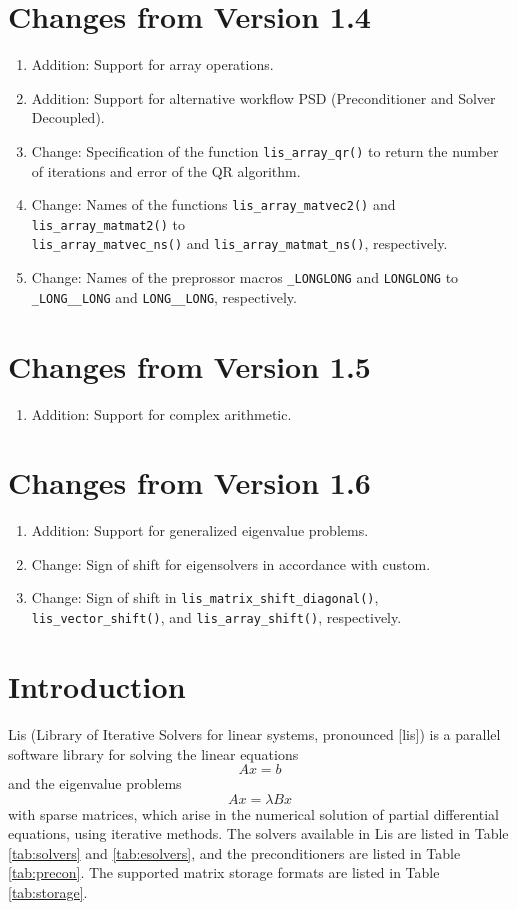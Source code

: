 \documentclass[a4paper]{article}
\begin{document}
\section*{Changes from Version 1.4}
\begin{enumerate}
\item Addition: Support for array operations.
\item Addition: Support for alternative workflow PSD (Preconditioner and Solver
      Decoupled). 
\item Change: Specification of the function 
      {\tt lis\_array\_qr()} to return 
      the number of iterations and error of the QR algorithm. 
\item Change: Names of the functions
      {\tt lis\_array\_matvec2()} and {\tt lis\_array\_matmat2()} to \\
      {\tt lis\_array\_matvec\_ns()} and {\tt lis\_array\_matmat\_ns()}, respectively.
\item Change: Names of the preprossor macros {\tt \_LONGLONG} and 
      {\tt LONGLONG} to {\tt \_LONG\_\_LONG} and {\tt LONG\_\_LONG}, respectively.
\end{enumerate}

\section*{Changes from Version 1.5}
\begin{enumerate}
\item Addition: Support for complex arithmetic.
\end{enumerate}
  
\section*{Changes from Version 1.6}
\begin{enumerate}
\item Addition: Support for generalized eigenvalue problems.
\item Change: Sign of shift for eigensolvers in accordance with custom.
\item Change: Sign of shift in {\tt lis\_matrix\_shift\_diagonal()}, 
{\tt lis\_vector\_shift()}, and {\tt lis\_array\_shift()}, respectively.
\end{enumerate}
  
\newpage
\section{Introduction}
Lis (Library of Iterative Solvers for linear systems, pronounced [lis])
is a parallel software library for solving the linear equations
\[
 Ax = b
\]
and the eigenvalue problems
\[
 Ax = \lambda Bx
\]
with sparse matrices, which arise in the numerical solution of
partial differential equations, using iterative methods\cite{nishida}.
The solvers available in Lis are listed in Table \ref{tab:solvers} and
\ref{tab:esolvers}, and the preconditioners are listed in Table \ref{tab:precon}.
The supported matrix storage formats are listed in Table \ref{tab:storage}.
\end{document}
